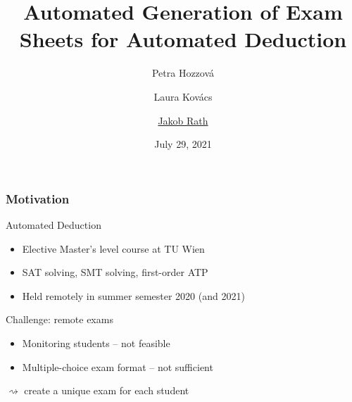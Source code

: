 \documentclass[xcolor={table}]{beamer}
\title{Automated Generation of Exam Sheets for Automated Deduction} %
\author{
    Petra Hozzov\'a
    \and
    Laura Kov\'acs
    \and
    \texorpdfstring{\underline{Jakob Rath}}{Jakob Rath}
}
\institute{
Vienna University of Technology%
}
\date{\vspace*{-3em}\small July 29, 2021} %
\begin{document}
\begin{frame}[plain]
\titlepage %
\end{frame}
\addtocounter{framenumber}{-1}



\begin{frame}
\frametitle{Motivation}

    \begin{block}{Automated Deduction}
        \begin{itemize}
            \item Elective Master's level course at TU Wien
            \item SAT solving, SMT solving, first-order ATP
            \item Held remotely in summer semester 2020 (and 2021)
        \end{itemize}
    \end{block}



    \medskip
    \pause

    \begin{alertblock}{Challenge: remote exams}
        \begin{itemize}
            \item Monitoring students -- not feasible
            \item Multiple-choice exam format -- not sufficient
        \end{itemize}
    \end{alertblock}
    \pause
    \vspace*{1em}
    \qquad $\rightsquigarrow$ create a unique exam for each student
\end{frame}
\end{document}
